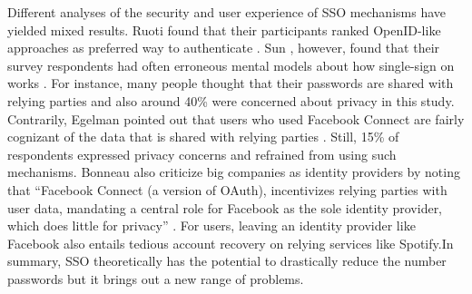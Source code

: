 	Different analyses of the security and user experience of SSO mechanisms have yielded mixed results. Ruoti \etal found that their participants ranked OpenID-like approaches as preferred way to authenticate \cite{Ruoti2015AuthenticationMelee}. Sun \etal, however, found that their survey respondents had often erroneous mental models about how single-sign on works \cite{Sun2011UsersRefuseSSO}. For instance, many people thought that their passwords are shared with relying parties and also around 40\% were concerned about privacy in this study.  Contrarily, Egelman pointed out that users who used Facebook Connect are fairly cognizant of the data that is shared with relying parties \cite{Egelman2013ProfilePassword}. Still, 15\% of respondents expressed privacy concerns and refrained from using such mechanisms. Bonneau \etal also criticize big companies as identity providers by noting that ``Facebook Connect (a version of OAuth), incentivizes relying parties with user data, mandating a central role for Facebook as the sole identity provider, which does little for privacy'' \cite{Bonneau2015ImperfectAuthentication}.	For users, leaving an identity provider like Facebook also entails tedious account recovery on relying services like Spotify.In summary, SSO theoretically has the potential to drastically reduce the number passwords but it brings out a new range of problems. 

